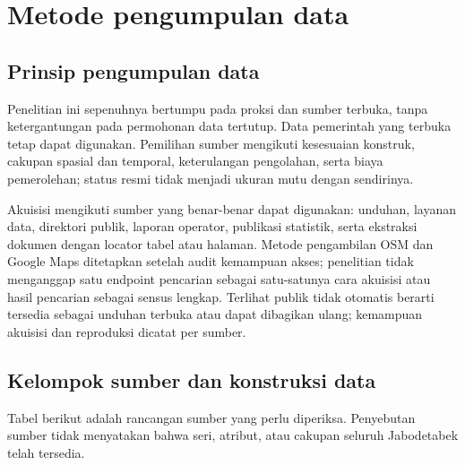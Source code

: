 \documentclass[11pt,a4paper,oneside,openany,indonesian]{report}
\begin{document}
\section{Metode pengumpulan data}\label{metode-pengumpulan-data}

\subsection{Prinsip pengumpulan
data}\label{prinsip-pengumpulan-data}

Penelitian ini sepenuhnya bertumpu pada proksi dan sumber terbuka, tanpa
ketergantungan pada permohonan data tertutup. Data pemerintah yang
terbuka tetap dapat digunakan. Pemilihan sumber mengikuti kesesuaian
konstruk, cakupan spasial dan temporal, keterulangan pengolahan, serta
biaya pemerolehan; status resmi tidak menjadi ukuran mutu dengan
sendirinya.

Akuisisi mengikuti sumber yang benar-benar dapat digunakan: unduhan,
layanan data, direktori publik, laporan operator, publikasi statistik,
serta ekstraksi dokumen dengan locator tabel atau halaman. Metode
pengambilan OSM dan Google Maps ditetapkan setelah audit kemampuan
akses; penelitian tidak menganggap satu endpoint pencarian sebagai
satu-satunya cara akuisisi atau hasil pencarian sebagai sensus lengkap.
Terlihat publik tidak otomatis berarti tersedia sebagai unduhan terbuka
atau dapat dibagikan ulang; kemampuan akuisisi dan reproduksi dicatat
per sumber.

\subsection{Kelompok sumber dan konstruksi
data}\label{kelompok-sumber-dan-konstruksi-data}

Tabel berikut adalah rancangan sumber yang perlu diperiksa. Penyebutan
sumber tidak menyatakan bahwa seri, atribut, atau cakupan seluruh
Jabodetabek telah tersedia.
\end{document}
